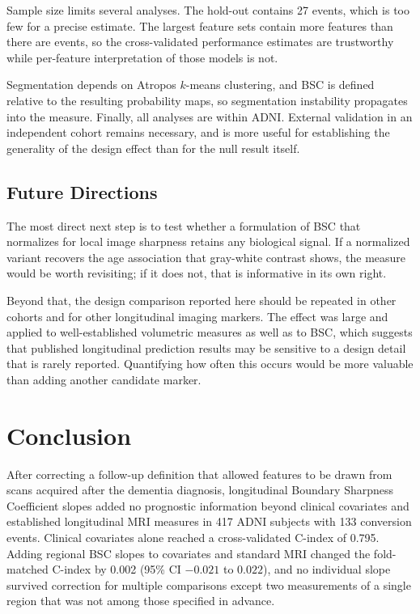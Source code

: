 \documentclass[blue]{ludusofficial}  %
\begin{document}
Sample size limits several analyses. The hold-out contains 27 events, which is too few for a precise estimate. The largest feature sets contain more features than there are events, so the cross-validated performance estimates are trustworthy while per-feature interpretation of those models is not.

Segmentation depends on Atropos $k$-means clustering, and BSC is defined relative to the resulting probability maps, so segmentation instability propagates into the measure. Finally, all analyses are within ADNI. External validation in an independent cohort remains necessary, and is more useful for establishing the generality of the design effect than for the null result itself.

\subsection{Future Directions}

The most direct next step is to test whether a formulation of BSC that normalizes for local image sharpness retains any biological signal. If a normalized variant recovers the age association that gray-white contrast shows, the measure would be worth revisiting; if it does not, that is informative in its own right.

Beyond that, the design comparison reported here should be repeated in other cohorts and for other longitudinal imaging markers. The effect was large and applied to well-established volumetric measures as well as to BSC, which suggests that published longitudinal prediction results may be sensitive to a design detail that is rarely reported. Quantifying how often this occurs would be more valuable than adding another candidate marker.

\section{Conclusion}

After correcting a follow-up definition that allowed features to be drawn from scans acquired after the dementia diagnosis, longitudinal Boundary Sharpness Coefficient slopes added no prognostic information beyond clinical covariates and established longitudinal MRI measures in 417 ADNI subjects with 133 conversion events. Clinical covariates alone reached a cross-validated C-index of 0.795. Adding regional BSC slopes to covariates and standard MRI changed the fold-matched C-index by 0.002 (95\% CI $-0.021$ to $0.022$), and no individual slope survived correction for multiple comparisons except two measurements of a single region that was not among those specified in advance.
\end{document}
